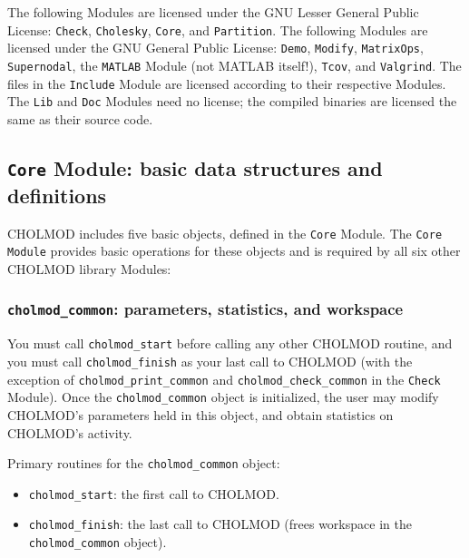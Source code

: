\documentclass[11pt]{article}
\begin{document}
The following Modules are licensed under the GNU Lesser General Public
License: {\tt Check}, {\tt Cholesky}, {\tt Core}, and {\tt Partition}.
The following Modules are licensed under the GNU General Public
License: {\tt Demo}, {\tt Modify}, {\tt MatrixOps}, {\tt Supernodal},
the {\tt MATLAB} Module (not MATLAB itself!), {\tt Tcov}, and {\tt Valgrind}.
The files in the {\tt Include} Module are licensed according to
their respective Modules.  The {\tt Lib} and {\tt Doc} Modules need
no license; the compiled binaries are licensed the same as their source code.

\newpage \subsection{{\tt Core} Module: basic data structures and definitions}

CHOLMOD includes five basic objects, defined in the {\tt Core} Module.
The {\tt Core Module} provides basic operations for these objects
and is required by all six other CHOLMOD library Modules:

\subsubsection{{\tt cholmod\_common}: parameters, statistics, and workspace}
    You must call {\tt cholmod\_start} before calling any other
    CHOLMOD routine, and you must call {\tt cholmod\_finish} as your
    last call to CHOLMOD (with the exception of
    {\tt cholmod\_print\_common} and {\tt cholmod\_check\_common}
    in the {\tt Check} Module).
    Once the {\tt cholmod\_common} object is initialized,
    the user may modify CHOLMOD's parameters held in this object,
    and obtain statistics on CHOLMOD's activity.

\vspace{0.1in}
\noindent Primary routines for the {\tt cholmod\_common} object:
    \begin{itemize}
    \item {\tt cholmod\_start}: the first call to CHOLMOD.
    \item {\tt cholmod\_finish}: the last call to CHOLMOD (frees workspace in the {\tt cholmod\_common} object).
    \end{itemize}
\end{document}
